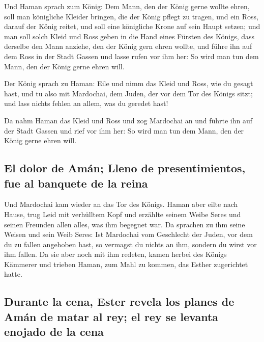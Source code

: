  Und Haman sprach zum König: Dem Mann, den der König gerne
wollte ehren,  soll man königliche Kleider bringen, die
der König pflegt zu tragen, und ein Ross, darauf der König reitet, und
soll eine königliche Krone auf sein Haupt setzen;  und man
soll solch Kleid und Ross geben in die Hand eines Fürsten des Königs,
dass derselbe den Mann anziehe, den der König gern ehren wollte, und
führe ihn auf dem Ross in der Stadt Gassen und lasse rufen vor ihm her:
So wird man tun dem Mann, den der König gerne ehren will.

 Der König sprach zu Haman: Eile und nimm das Kleid und
Ross, wie du gesagt hast, und tu also mit Mardochai, dem Juden, der vor
dem Tor des Königs sitzt; und lass nichts fehlen an allem, was du
geredet hast!

 Da nahm Haman das Kleid und Ross und zog Mardochai an
und führte ihn auf der Stadt Gassen und rief vor ihm her: So wird man
tun dem Mann, den der König gerne ehren will.

\hypertarget{el-dolor-de-amuxe1n-lleno-de-presentimientos-fue-al-banquete-de-la-reina}{%
\subsection{El dolor de Amán; Lleno de presentimientos, fue al banquete
de la
reina}\label{el-dolor-de-amuxe1n-lleno-de-presentimientos-fue-al-banquete-de-la-reina}}

 Und Mardochai kam wieder an das Tor des Königs. Haman
aber eilte nach Hause, trug Leid mit verhülltem Kopf  und
erzählte seinem Weibe Seres und seinen Freunden allen alles, was ihm
begegnet war. Da sprachen zu ihm seine Weisen und sein Weib Seres: Ist
Mardochai vom Geschlecht der Juden, vor dem du zu fallen angehoben hast,
so vermagst du nichts an ihm, sondern du wirst vor ihm fallen.
 Da sie aber noch mit ihm redeten, kamen herbei des
Königs Kämmerer und trieben Haman, zum Mahl zu kommen, das Esther
zugerichtet hatte.

\hypertarget{durante-la-cena-ester-revela-los-planes-de-amuxe1n-de-matar-al-rey-el-rey-se-levanta-enojado-de-la-cena}{%
\subsection{Durante la cena, Ester revela los planes de Amán de matar al
rey; el rey se levanta enojado de la
cena}\label{durante-la-cena-ester-revela-los-planes-de-amuxe1n-de-matar-al-rey-el-rey-se-levanta-enojado-de-la-cena}}

